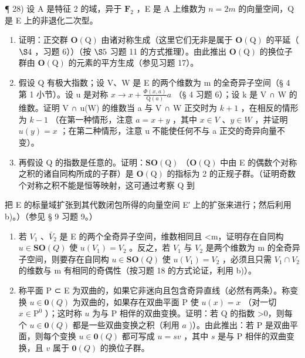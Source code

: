 ¶ 28) 设 A 是特征 2 的域，异于 \(\mathbf{F}_{2}\) ，E 是 A 上维数为 \(n = 2m\) 的向量空间，Q 是 E 上的非退化二次型。

\begin{enumerate}
\def\labelenumi{\alph{enumi})}
\item
  证明：正交群 \(\mathbf{O}(\mathrm{Q})\) 由诸对称生成（这里它们无非是属于 \(\mathbf{O}(\mathrm{Q})\) 的平延（ \(\S 4\) ，习题 6））（按 \(\S 5\) 习题 11 的方式推理）。由此推出 \(\mathbf{O}(\mathrm{Q})\) 的换位子群由 \(\mathbf{O}(\mathrm{Q})\) 的元素的平方生成（参见习题 17）。
\item
  假设 Q 有极大指数；设 V、W 是 E 的两个维数为 m 的全奇异子空间（§ 4 第 1 小节）。设 u 是对称 \(x \to x + \frac{\Phi(x, a)}{\mathrm{Q}(a)} a\) （§ 4 习题 6）；设 k 是 V ∩ W 的维数。证明 V ∩ u(W) 的维数当 a 与 V ∩ W 正交时为 \(k + 1\) ，在相反的情形为 \(k - 1\) （在第一种情形，注意 \(a = x + y\) ，其中 \(x \in V\) 、\(y \in W\) ，并证明 \(u(y) = x\) ；在第二种情形，注意 u 不能使任何不与 a 正交的奇异向量不变）。
\item
  再假设 Q 的指数是任意的。证明：\(\mathbf{SO}(\mathrm{Q})\) （\(\mathbf{O}(\mathrm{Q})\) 中由 E 的偶数个对称之积的诸自同构所成的子群）是 \(\mathbf{O}(\mathrm{Q})\) 的指标为 2 的正规子群。（证明奇数个对称之积不能是恒等映射，这可通过考察 Q 到
\end{enumerate}

把 E 的标量域扩张到其代数闭包所得的向量空间 E′ 上的扩张来进行；然后利用 b)。）（参见 § 9 习题 9。）

\begin{enumerate}
\def\labelenumi{\alph{enumi})}
\setcounter{enumi}{3}
\item
  若 \(V_{1}\) 、\(\bar{V}_{2}\) 是 E 的两个全奇异子空间，维数相同且 \textless m，证明存在自同构 \(u \in \mathbf{SO}(Q)\) 使 \(u(V_{1}) = V_{2}\) 。反之，若 \(V_{1}\) 与 \(V_{2}\) 是两个维数为 m 的全奇异子空间，则要存在自同构 \(u \in \mathbf{SO}(Q)\) 使 \(u(V_{1}) = V_{2}\) ，必须且只需 \(V_{1} \cap V_{2}\) 的维数与 m 有相同的奇偶性（按习题 18 的方式论证，利用 b)）。
\item
  称平面 P ⊂ E 为双曲的，如果它非迷向且包含奇异直线（必然有两条）。称变换 \(u \in \mathbf{0}(Q)\) 为双曲的，如果存在双曲平面 P 使 \(u(x) = x\) （对一切 \(x \in \mathrm{P}^0\) ）；这时称 \(u\) 为与 P 相伴的双曲变换。证明：若 Q 的指数 \textgreater0，则每个 \(u \in \mathbf{0}(Q)\) 都是一些双曲变换之积（利用 \(a\) )）。由此推出：若 P 是双曲平面，则每个变换 \(u \in \mathbf{0}(Q)\) 都可写成 \(u = sv\) ，其中 \(s\) 是与 P 相伴的双曲变换，且 \(v\) 属于 \(\mathbf{0}(Q)\) 的换位子群。
\end{enumerate}

